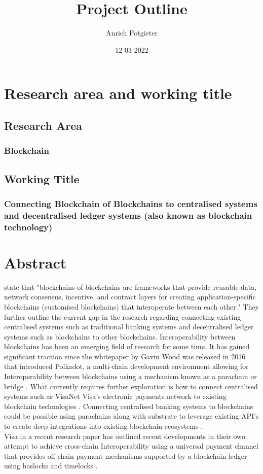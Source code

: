 \documentclass[12pt]{article}
\title{Project Outline}
\author{Anrich Potgieter}
\date{12-03-2022}
\begin{document}
\maketitle
\tableofcontents

\section{Research area and working title}
\subsection{Research Area}
\subsubsection{Blockchain}

\subsection{Working Title}
\subsubsection{Connecting Blockchain of Blockchains to centralised systems and decentralised ledger systems (also known as blockchain technology)}


\section{Abstract}
\autocite{belchiorSurveyBlockchainInteroperability2021}
state that "blockchains of blockchains are frameworks that provide reusable data, network consensus, incentive, 
and contract layers for creating application-specific blockchains (customised blockchains) that interoperate between each other."
They further outline the current gap in the research regarding connecting existing centralised systems such as traditional banking
systems and decentralised ledger systems such as blockchains to other blockchains. Interoperability between blockchains has been an emerging field of
research for some time. It has gained significant traction since the whitepaper by Gavin Wood was released in 2016 that introduced Polkadot, 
a multi-chain development environment allowing for Interoperability between blockchains using a mechanism known as a parachain or bridge \autocite{woodPOLKADOTVISIONHETEROGENEOUS2016}.
What currently requires further exploration is how to connect centralised systems such as VisaNet Visa's electronic payments network to existing blockchain technologies \autocite{VisaNetTechnologyVisa}.
Connecting centralised banking systems to blockchains could be possible using parachains along with substrate to leverage existing API's to create deep integrations into existing blockchain ecosystems \autocite{polkadotPolkadotDecoded20202021}.
\\ Visa in a recent research paper has outlined recent developments in their own attempt to achieve cross-chain Interoperability using a universal payment channel that provides off chain payment mechanisms 
supported by a blockchain ledger using haslocks and timelocks \autocite{christodorescuUniversalPaymentChannels2021}.
\end{document}
